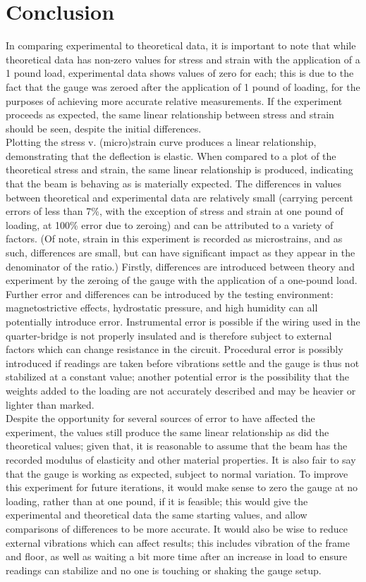 \documentclass{article}
\begin{document}
    \section{Conclusion}
    \indent In comparing experimental to theoretical data, it is important to note that while theoretical data has non-zero values for stress and strain with the application of a 1 pound load, experimental data shows values of zero for each; this is due to the fact that the gauge was zeroed after the application of 1 pound of loading, for the purposes of achieving more accurate relative measurements. If the experiment proceeds as expected, the same linear relationship between stress and strain should be seen, despite the initial differences. \\
    \indent Plotting the stress v. (micro)strain curve produces a linear relationship, demonstrating that the deflection is elastic. When compared to a plot of the theoretical stress and strain, the same linear relationship is produced, indicating that the beam is behaving as is materially expected. The differences in values between theoretical and experimental data are relatively small (carrying percent errors of less than 7\%, with the exception of stress and strain at one pound of loading, at 100\% error due to zeroing) and can be attributed to a variety of factors. (Of note, strain in this experiment is recorded as microstrains, and as such, differences are small, but can have significant impact as they appear in the denominator of the ratio.)  Firstly, differences are introduced between theory and experiment by the zeroing of the gauge with the application of a one-pound load. Further error and differences can be introduced by the testing environment: magnetostrictive effects, hydrostatic pressure, and high humidity can all potentially introduce error. Instrumental error is possible if the wiring used in the quarter-bridge is not properly insulated and is therefore subject to external factors which can change resistance in the circuit. Procedural error is possibly introduced if readings are taken before vibrations settle and the gauge is thus not stabilized at a constant value; another potential error is the possibility that the weights added to the loading are not accurately described and may be heavier or lighter than marked. \\
    \indent Despite the opportunity for several sources of error to have affected the experiment, the values still produce the same linear relationship as did the theoretical values; given that, it is reasonable to assume that the beam has the recorded modulus of elasticity and other material properties. It is also fair to say that the gauge is working as expected, subject to normal variation. To improve this experiment for future iterations, it would make sense to zero the gauge at no loading, rather than at one pound, if it is feasible; this would give the experimental and theoretical data the same starting values, and allow comparisons of differences to be more accurate. It would also be wise to reduce external vibrations which can affect results; this includes vibration of the frame and floor, as well as waiting a bit more time after an increase in load to ensure readings can stabilize and no one is touching or shaking the gauge setup. \\
\end{document}
